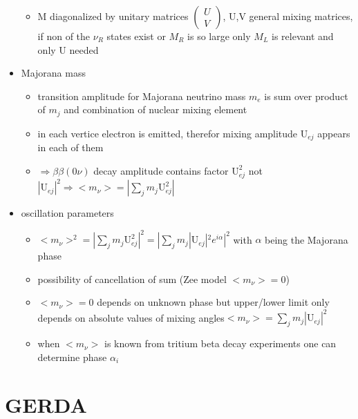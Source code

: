 \documentclass[encoding=utf8,british]{tumphthesis}
\begin{document}
\begin{itemize}
\begin{itemize}
\item M diagonalized by unitary matrices \(\begin{pmatrix} U \\ V \end{pmatrix}\), U,V general mixing matrices, if non of the \(\nu_R\) states exist or \(M_R\) is so large only \(M_L\) is relevant and only U needed
\end{itemize}
\item Majorana mass
\begin{itemize}
\item transition amplitude for Majorana neutrino mass \(m_e\) is sum over product of \(m_j\) and combination of nuclear mixing element
\item in each vertice electron is emitted, therefor mixing amplitude \(\mathrm{U}_{ej}\) appears in each of them
\item \(\Rightarrow \beta\beta(0\nu)\) decay amplitude contains factor \(\mathrm{U}_{ej}^2\) not \(|\mathrm{U}_{ej}|^2 \Rightarrow <m_\nu> = |\sum_jm_j\mathrm{U}_{ej}^2|\) 
\end{itemize}
\item oscillation parameters
\begin{itemize}
\item \(<m_\nu>^2 = |\sum_jm_j\mathrm{U}_{ej}^2|^2 = |\sum_jm_j|\mathrm{U}_{ej}|^2e^{i\alpha}|^2\) with \(\alpha\) being the Majorana phase
\item possibility of cancellation of sum (Zee model \(<m_\nu> = 0\))
\item \(<m_\nu> = 0\) depends on unknown phase but upper/lower limit only depends on absolute values of mixing angles\(<m_\nu> = \sum_jm_j|\mathrm{U}_{ej}|^2\)
\item when \(<m_\nu>\) is known from tritium beta decay experiments one can determine phase \(\alpha_i\)
\end{itemize}
\end{itemize}

 


\label{sec:Kry85}


\chapter{GERDA}
\label{sec:GERDA}
\end{document}
